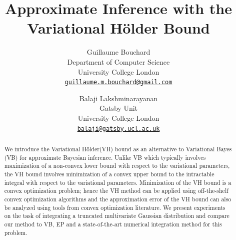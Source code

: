 \documentclass[reqno,oneside,letterpaper,10pt]{article}
\newcommand{\Holder}{H\"older\xspace}
\newcommand{\red}[1]{{\color{red}#1}}
\begin{document}
\title{Approximate Inference with the Variational \Holder Bound}
\date{}


\author{ Guillaume Bouchard \\
Department of Computer Science\\ University College London\\
\href{guillaume.m.bouchard@gmail.com}{\nolinkurl{guillaume.m.bouchard@gmail.com}} \\
\and
Balaji Lakshminarayanan  \\
Gatsby Unit\\ University College London          \\
\href{balaji@gatsby.ucl.ac.uk}{\nolinkurl{balaji@gatsby.ucl.ac.uk}}
}

\maketitle


\begin{abstract} 
We introduce the Variational \Holder (VH) bound as an alternative to Variational Bayes (VB) for approximate Bayesian inference. Unlike VB which typically involves maximization of a non-convex lower bound with respect to the variational parameters, the VH bound involves minimization of a convex upper bound to the intractable integral with respect to the variational parameters. Minimization of the VH bound is a convex optimization problem; hence the VH method can be applied using off-the-shelf convex optimization algorithms and the approximation error of the VH bound can also be analyzed using tools from convex optimization literature. 
We present experiments on the task of integrating a truncated multivariate Gaussian distribution and compare our method to VB, EP and a state-of-the-art numerical integration method for this problem. 
\end{abstract} 
\end{document}
